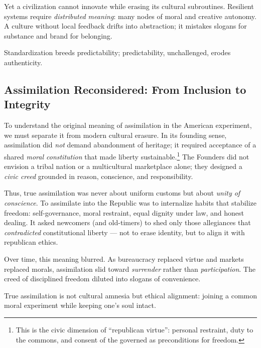 \documentclass[12pt,twoside]{book}
\begin{document}
Yet a civilization cannot innovate while erasing its cultural subroutines.  
Resilient systems require \emph{distributed meaning}: many nodes of moral and creative autonomy.  
A culture without local feedback drifts into abstraction; it mistakes slogans for substance and brand for belonging. \\

\begin{keyidea}
Standardization breeds predictability; predictability, unchallenged, erodes authenticity.
\end{keyidea}

\subsection*{Assimilation Reconsidered: From Inclusion to Integrity}

To understand the original meaning of assimilation in the American experiment, we must separate it from modern cultural erasure.  
In its founding sense, assimilation did \emph{not} demand abandonment of heritage; it required acceptance of a shared \emph{moral constitution} that made liberty sustainable.\footnote{This is the civic dimension of “republican virtue”: personal restraint, duty to the commons, and consent of the governed as preconditions for freedom.}  
The Founders did not envision a tribal nation or a multicultural marketplace alone; they designed a \emph{civic creed} grounded in reason, conscience, and responsibility.

Thus, true assimilation was never about uniform customs but about \emph{unity of conscience}.  
To assimilate into the Republic was to internalize habits that stabilize freedom: self-governance, moral restraint, equal dignity under law, and honest dealing.  
It asked newcomers (and old-timers) to shed only those allegiances that \emph{contradicted} constitutional liberty — not to erase identity, but to align it with republican ethics.

Over time, this meaning blurred.  
As bureaucracy replaced virtue and markets replaced morals, assimilation slid toward \emph{surrender} rather than \emph{participation}.  
The creed of disciplined freedom diluted into slogans of convenience.\\

\begin{keyidea}
True assimilation is not cultural amnesia but ethical alignment: joining a common moral experiment while keeping one’s soul intact.
\end{keyidea}
\end{document}
